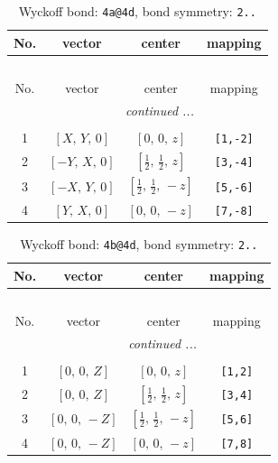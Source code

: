 \documentclass[fleqn,8pt]{jsarticle}
\begin{document}
\begin{longtable}{cccc}
\caption{Wyckoff bond: {\tt 4a@4d}, bond symmetry: {\tt 2..}}
 \\
 \hline \hline
No. & vector & center & mapping \\ \hline \endfirsthead

\multicolumn{3}{l}{\tablename\ \thetable{}} \\
 \hline \hline
No. & vector & center & mapping \\ \hline \endhead

 \hline \hline
\multicolumn{3}{r}{\footnotesize\it continued ...} \\ \endfoot

 \hline \hline
\multicolumn{3}{r}{} \\ \endlastfoot

1 & $\left[ X,\, Y,\, 0 \right]$ & $\left[ 0,\, 0,\, z \right]$ & {\tt [1,-2]} \\ \hline
2 & $\left[ - Y,\, X,\, 0 \right]$ & $\left[ \frac{1}{2},\, \frac{1}{2},\, z \right]$ & {\tt [3,-4]} \\ \hline
3 & $\left[ - X,\, Y,\, 0 \right]$ & $\left[ \frac{1}{2},\, \frac{1}{2},\, - z \right]$ & {\tt [5,-6]} \\ \hline
4 & $\left[ Y,\, X,\, 0 \right]$ & $\left[ 0,\, 0,\, - z \right]$ & {\tt [7,-8]} \\
\end{longtable}
\renewcommand{\arraystretch}{1.2}
\begin{longtable}{cccc}
\caption{Wyckoff bond: {\tt 4b@4d}, bond symmetry: {\tt 2..}}
 \\
 \hline \hline
No. & vector & center & mapping \\ \hline \endfirsthead

\multicolumn{3}{l}{\tablename\ \thetable{}} \\
 \hline \hline
No. & vector & center & mapping \\ \hline \endhead

 \hline \hline
\multicolumn{3}{r}{\footnotesize\it continued ...} \\ \endfoot

 \hline \hline
\multicolumn{3}{r}{} \\ \endlastfoot

1 & $\left[ 0,\, 0,\, Z \right]$ & $\left[ 0,\, 0,\, z \right]$ & {\tt [1,2]} \\ \hline
2 & $\left[ 0,\, 0,\, Z \right]$ & $\left[ \frac{1}{2},\, \frac{1}{2},\, z \right]$ & {\tt [3,4]} \\ \hline
3 & $\left[ 0,\, 0,\, - Z \right]$ & $\left[ \frac{1}{2},\, \frac{1}{2},\, - z \right]$ & {\tt [5,6]} \\ \hline
4 & $\left[ 0,\, 0,\, - Z \right]$ & $\left[ 0,\, 0,\, - z \right]$ & {\tt [7,8]} \\
\end{longtable}
\end{document}
